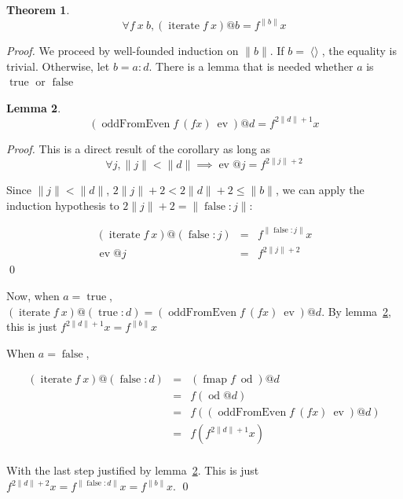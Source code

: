 \documentclass{llncs}
\DeclareMathOperator{\oddFrom}{oddFromEven}
\DeclareMathOperator{\nil}{\langle\rangle}
\DeclareMathOperator{\true}{true}
\DeclareMathOperator{\false}{false}
\DeclareMathOperator{\fmap}{fmap}
\DeclareMathOperator{\iter}{iterate}
\newcommand{\ord}[1]{\|#1\|}
\newcommand{\cons}[2]{#1:#2}
\DeclareMathOperator{\ev}{ev}
\DeclareMathOperator{\od}{od}
\newtheorem{theorem}{Theorem}
\newtheorem{lemma}[theorem]{Lemma}
\begin{document}
\begin{theorem}\label{iterateCorrect}
\begin{displaymath}
\forall f\ x\ b, (\iter f\ x)@b = f^{\ord{b}} x
\end{displaymath}
\end{theorem}
\begin{proof}

We proceed by well-founded induction on $\ord{b}$.
If $b = \nil$, the equality is trivial.
Otherwise, let $b = \cons{a}{d}$.
There is a lemma that is needed whether $a$ is $\true$ or $\false$

\begin{lemma}\label{iterateSublemma}
\begin{displaymath}
(\oddFrom f\ (f x)\ \ev)@d = f^{2\ord{d}+1}x
\end{displaymath}
\end{lemma}
\begin{proof}
This is a direct result of the corollary as long as 
\begin{displaymath}
\forall j, \ord{j} < \ord{d} \implies \ev @j = f^{2\ord{j}+2}
\end{displaymath}

Since $\ord{j} < \ord{d}$, $2\ord{j}+2 < 2\ord{d}+2 \leq \ord{b}$, we can apply the induction hypothesis to $2\ord{j}+2 = \ord{\cons{\false}{j}}$:

\begin{displaymath}
\begin{array}{rcl}
(\iter f\ x)@(\cons{\false}{j}) & = & f^{\ord{\cons{\false}{j}}} x \\
\ev @j & = & f^{2\ord{j}+2}
\end{array}
\end{displaymath}
\qed
\end{proof}

Now, when $a = \true$, $(\iter f\ x)@(\cons{\true}{d}) = (\oddFrom f\ (f x)\ \ev)@d$.
By lemma~\ref{iterateSublemma}, this is just $f^{2\ord{d}+1}x = f^{\ord{b}}x$

When $a = \false$, 

\begin{displaymath}
\begin{array}{rcl}
(\iter f\ x)@(\cons{\false}{d}) & = & (\fmap f\ \od)@d \\
& = & f(\od @d) \\
& = & f((\oddFrom f\ (f x)\ \ev)@d) \\
& = & f(f^{2\ord{d}+1}x) \\
\end{array}
\end{displaymath}

With the last step justified by lemma~\ref{iterateSublemma}. This is just $f^{2\ord{d}+2}x = f^{\ord{\cons{\false}{d}}}x = f^{\ord{b}}x$.
\qed
\end{proof}
\end{document}
